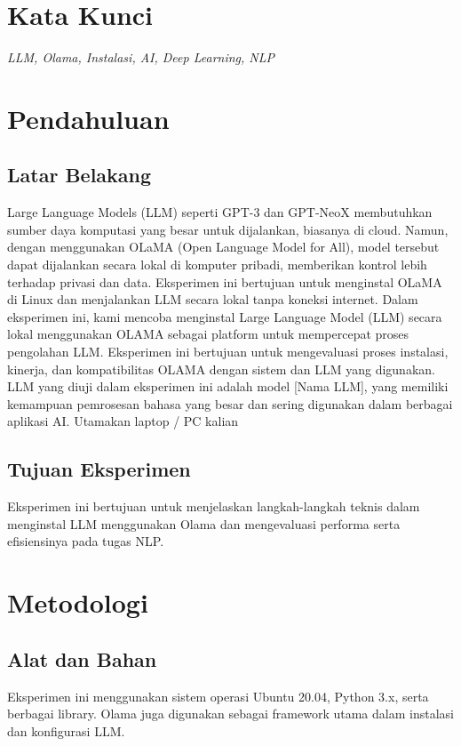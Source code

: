 \documentclass[a4paper,12pt, bahasa]{article}
\begin{document}
\section*{Kata Kunci}
\textit{LLM, Olama, Instalasi, AI, Deep Learning, NLP}

\section{Pendahuluan}
\subsection{Latar Belakang}
Large Language Models (LLM) seperti GPT-3 dan GPT-NeoX membutuhkan sumber daya
komputasi yang besar untuk dijalankan, biasanya di cloud. Namun, dengan menggunakan
OLaMA (Open Language Model for All), model tersebut dapat dijalankan secara lokal di
komputer pribadi, memberikan kontrol lebih terhadap privasi dan data. Eksperimen ini
bertujuan untuk menginstal OLaMA di Linux dan menjalankan LLM secara lokal tanpa koneksi
internet.
Dalam eksperimen ini, kami mencoba menginstal Large Language Model (LLM) secara lokal
menggunakan OLAMA sebagai platform untuk mempercepat proses pengolahan LLM.
Eksperimen ini bertujuan untuk mengevaluasi proses instalasi, kinerja, dan kompatibilitas
OLAMA dengan sistem dan LLM yang digunakan. LLM yang diuji dalam eksperimen ini adalah
model [Nama LLM], yang memiliki kemampuan pemrosesan bahasa yang besar dan sering
digunakan dalam berbagai aplikasi AI. Utamakan laptop / PC kalian

\subsection{Tujuan Eksperimen}
Eksperimen ini bertujuan untuk menjelaskan langkah-langkah teknis dalam menginstal
LLM menggunakan Olama dan mengevaluasi performa serta efisiensinya pada tugas NLP.

\section{Metodologi}
\subsection{Alat dan Bahan}
Eksperimen ini menggunakan sistem operasi Ubuntu 20.04, Python 3.x, serta berbagai
library. Olama juga digunakan sebagai framework utama dalam instalasi dan konfigurasi
LLM. 
\end{document}
